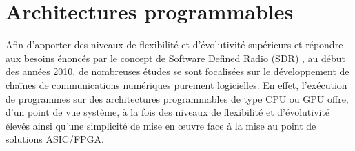 \documentclass[../main.tex]{subfiles}
\begin{document}
\section{Architectures programmables}
%
% 
% 
% 
% 
Afin d’apporter des niveaux de flexibilité et d’évolutivité supérieurs et répondre aux besoins énoncés par le concept de Software Defined Radio (SDR) \cite{SDR}, au début des années 2010, de nombreuses études se sont focalisées sur le développement de chaînes de communications numériques purement logicielles. En effet, l’exécution de programmes sur des architectures programmables de type CPU ou GPU offre, d’un point de vue système, à la fois des niveaux de flexibilité et d’évolutivité élevés ainsi qu’une simplicité de mise en œuvre face à la mise au point de solutions ASIC/FPGA.
\end{document}
